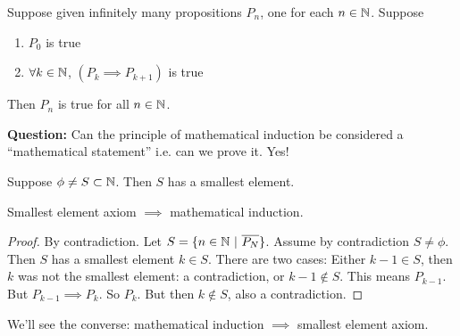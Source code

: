 \documentclass[10pt]{scrartcl}
\begin{document}
\begin{definition}
Suppose given infinitely many propositions $P_n$, one for each $n \in\mathbb{N}$. Suppose \vspace*{5pt}
\begin{enumerate}
\item $P_0$ is true
\item $\forall k\in\mathbb{N}$, $(P_k \implies P_{k+1})$ is true	
\end{enumerate}

Then $P_n$ is true for all $n\in\mathbb{N}$. 
\end{definition}

\textbf{Question:} {Can the principle of mathematical induction be considered a ``mathematical statement'' i.e. can we prove it.} Yes!\\


\begin{axiom}
Suppose $\phi \neq S \subset \mathbb{N}$. Then $S$ has a smallest element. 
\end{axiom}\vspace*{5pt}

\begin{proposition}
Smallest element axiom $\implies$ mathematical induction.	
\end{proposition}
\begin{proof}By contradiction. Let $S = \{n \in\mathbb{N} ~|~ \overline{P_N}\}$. Assume by contradiction $S \neq \phi$. Then $S$ has a smallest element $k \in S$. There are two cases: Either $k - 1 \in S$, then $k$ was not the smallest element: a contradiction, or $k-1 \not \in S$. This means $P_{k-1}$. But $P_{k-1} \implies P_k$. So $P_k$. But then $k \not \in S$, also a contradiction.	
\end{proof}

We'll see the converse: mathematical induction $\implies$ smallest element axiom.\\
\end{document}
